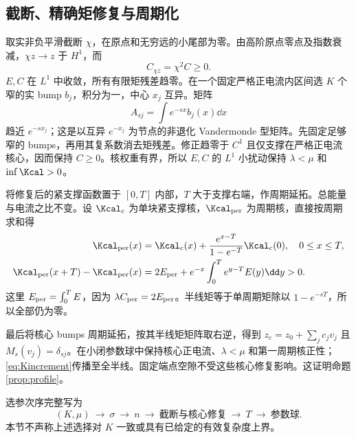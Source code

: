 \subsection{截断、精确矩修复与周期化}
取实非负平滑截断 $\chi$，在原点和无穷远的小尾部为零。由高阶原点零点及指数衰减，$\chi z\to z$ 于 $H^1$，而
\[
C_{\chi z}=\chi^2C\ge0.
\]
$E,C$ 在 $L^1$ 中收敛，所有有限矩残差趋零。在一个固定严格正电流内区间选 $K$ 个窄的实 bump $b_j$，积分为一，中心 $x_j$ 互异。矩阵
\[
A_{sj}=\int e^{-sx}b_j(x)\dd x
\]
趋近 $e^{-sx_j}$；这是以互异 $e^{-x_j}$ 为节点的非退化 Vandermonde 型矩阵。先固定足够窄的 bumps，再用其复系数消去矩残差。修正趋零于 $C^1$ 且仅支撑在严格正电流核心，因而保持 $C\ge0$。核权重有界，所以 $E,C$ 的 $L^1$ 小扰动保持 $\lambda<\mu$ 和 $\inf\Kcal>0$。

将修复后的紧支撑函数置于 $[0,T]$ 内部，$T$ 大于支撑右端，作周期延拓。总能量与电流之比不变。设 $\Kcal_c$ 为单块紧支撑核，$\Kcal_{\rm per}$ 为周期核，直接按周期求和得
\begin{align}
\Kcal_{\rm per}(x)&=\Kcal_c(x)
+\frac{e^{x-T}}{1-e^{-T}}\Kcal_c(0),\quad0\le x\le T,\label{eq:periodK}\\
\Kcal_{\rm per}(x+T)-\Kcal_{\rm per}(x)
&=2E_{\rm per}+e^{-x}\int_0^T e^{y-T}E(y)\dd y>0.\label{eq:Kincrement}
\end{align}
这里 $E_{\rm per}=\int_0^TE$，因为 $\lambda C_{\rm per}=2E_{\rm per}$。半线矩等于单周期矩除以 $1-e^{-sT}$，所以全部仍为零。

最后将核心 bumps 周期延拓，按其半线矩矩阵取右逆，得到 $z_c=z_0+\sum_jc_jv_j$ 且 $M_s(v_j)=\delta_{sj}$。在小闭参数球中保持核心正电流、$\lambda<\mu$ 和第一周期核正性；\eqref{eq:Kincrement}传播至全半线。固定端点空隙不受这些核心修复影响。这证明命题\ref{prop:profile}。

选参次序完整写为
\[
(K,\mu)\ \longrightarrow\ \sigma\ \longrightarrow\ n
\ \longrightarrow\ \text{截断与核心修复}
\ \longrightarrow\ T\ \longrightarrow\ \text{参数球}.
\]
本节不声称上述选择对 $K$ 一致或具有已给定的有效复杂度上界。
